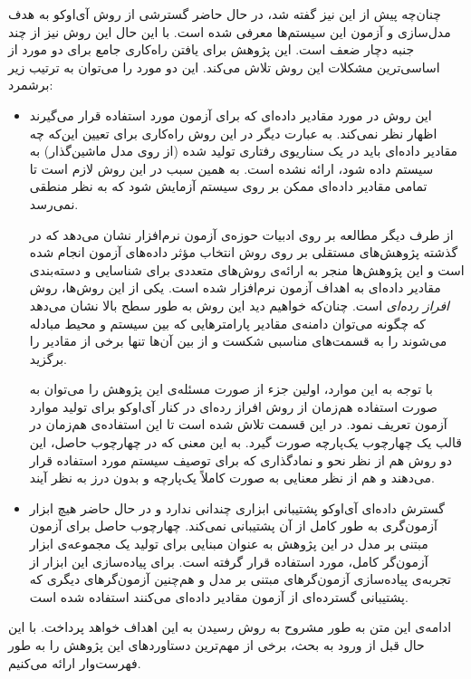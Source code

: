چنان‌چه پیش از این نیز گفته شد، در حال حاضر گسترشی از روش آی‌اوکو به هدف مدل‌سازی و آزمون این سیستم‌ها معرفی شده‌ است. با این حال این روش نیز از چند جنبه دچار ضعف است. این پژوهش برای یافتن راه‌کاری جامع برای دو مورد از اساسی‌ترین مشکلات این روش تلاش می‌کند. این دو مورد را می‌توان به ترتیب زیر برشمرد:
\begin{itemize}
\item این روش در مورد مقادیر داده‌ای که برای آزمون مورد استفاده قرار می‌گیرند اظهار نظر نمی‌کند. به عبارت دیگر در این روش‌ راه‌کاری برای تعیین این‌که چه مقادیر داد‌ه‌ای باید در یک سناریوی رفتاری تولید شده (از روی مدل ماشین‌گذار) به سیستم داده شود، ارائه نشده است. به همین سبب در این روش‌ لازم است تا تمامی مقادیر داده‌ای ممکن بر روی سیستم آزمایش شود که به نظر منطقی نمی‌رسد.

از طرف دیگر مطالعه بر روی ادبیات حوزه‌ی آزمون نرم‌افزار نشان می‌دهد که در گذشته پژوهش‌های مستقلی بر روی روش انتخاب مؤثر داده‌های آزمون انجام شده است و این پژوهش‌ها منجر به ارائه‌ی روش‌های متعددی برای شناسایی و  دسته‌بندی مقادیر داده‌ای به اهداف آزمون نرم‌افزار شده است. یکی از این روش‌ها، روش \emph{افراز رده‌ای} است. چنان‌که خواهیم دید این روش به طور سطح بالا نشان می‌دهد که چگونه می‌توان دامنه‌ی مقادیر پارامترهایی که بین سیستم و محیط مبادله می‌شوند را به قسمت‌های مناسبی شکست و از بین آن‌ها تنها برخی از مقادیر را برگزید.

با توجه به این موارد، اولین جزء از صورت مسئله‌ی این پژوهش را می‌توان به صورت استفاده هم‌زمان از روش افراز رده‌ای در کنار آی‌اوکو برای تولید موارد آزمون تعریف نمود. در این قسمت تلاش شده است تا این استفاده‌ی هم‌زمان در قالب یک چهارچوب یک‌پارچه صورت گیرد. به این معنی که در چهارچوب حاصل، این دو روش هم از نظر نحو و نمادگذاری که برای توصیف سیستم مورد استفاده قرار می‌دهند و هم از نظر معنایی به صورت کاملاً \gls*{یک‌پارچه} و \gls*{بدون درز} به نظر آیند. 

\item گسترش داده‌ای آی‌اوکو پشتیبانی ابزاری چندانی ندارد و در حال حاضر هیچ ابزار آزمون‌گری به طور کامل از آن پشتیبانی نمی‌کند. چهارچوب حاصل برای آزمون مبتنی بر مدل در این پژوهش به عنوان مبنایی برای تولید یک مجموعه‌ی ابزار آزمون‌گر کامل، مورد استفاده قرار گرفته است. برای پیاده‌سازی این ابزار از تجربه‌ی پیاده‌سازی آزمون‌گرهای مبتنی بر مدل و هم‌چنین آزمون‌گرهای دیگری که پشتیبانی گسترده‌ای از آزمون مقادیر داده‌ای می‌کنند استفاده شده است.
\end{itemize}

ادامه‌ی این متن به طور مشروح به روش رسیدن به این اهداف خواهد پرداخت. با این حال قبل از ورود به بحث، برخی از مهم‌ترین دستاوردهای این پژوهش را به طور فهرست‌وار ارائه می‌کنیم.
